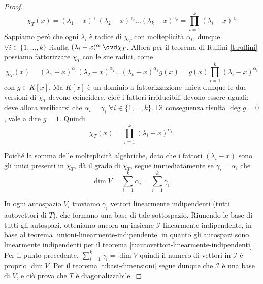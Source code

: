\begin{proof}
\begin{equation}
		\chi_T(x)=(\lambda_1-x)^{\gamma_1}(\lambda_2-x)^{\gamma_2}\dots(\lambda_k-x)^{\gamma_k}=\prod_{i=1}^k(\lambda_i-x)^{\gamma_i}
	\end{equation}
	Sappiamo però che ogni $\lambda_i$ è radice di $\chi_T$ con molteplicità $\alpha_i$, dunque $\forall i\in\{1,\dots,k\}$ risulta $(\lambda_i-x)^{\alpha_i}\dvd\chi_T$.
	Allora per il teorema di Ruffini \ref{t:ruffini} possiamo fattorizzare $\chi_T$ con le sue radici, come
	\begin{equation*}
		\chi_T(x)=(\lambda_1-x)^{\alpha_1}(\lambda_2-x)^{\alpha_2}\dots(\lambda_k-x)^{\alpha_k}g(x)=g(x)\prod_{i=1}^k(\lambda_i-x)^{\alpha_i}
	\end{equation*}
	con $g\in K[x]$.
	Ma $K[x]$ è un dominio a fattorizzazione unica %
	dunque le due versioni di $\chi_T$ devono coincidere, cioè i fattori irriducibili devono essere uguali: deve allora verificarsi che $\alpha_i=\gamma_i$ $\forall i\in\{1,\dots,k\}$.
	Di conseguenza risulta $\deg g=0$, vale a dire $g=1$.
	Quindi
	\begin{equation*}
		\chi_T(x)=\prod_{i=1}^k(\lambda_i-x)^{\alpha_i}.
	\end{equation*}

	Poich\'e la somma delle molteplicità algebriche, dato che i fattori $(\lambda_i-x)$ sono gli unici presenti in $\chi_T$, dà il grado di $\chi_T$, segue immediatamente se $\gamma_i=\alpha_i$ che
	\begin{equation}
		\dim V=\sum_{i=1}^k\alpha_i=\sum_{i=1}^k\gamma_i.
	\end{equation}

	In ogni autospazio $V_i$ troviamo $\gamma_i$ vettori linearmente indipendenti (tutti autovettori di $T$), che formano una base di tale sottospazio.
	Riunendo le base di tutti gli autospazi, otteniamo ancora un insieme $\mathcal I$ linearmente indipendente, in base al teorema \ref{unioni-linearmente-indipendente} %
	in quanto gli autospazi sono linearmente indipendenti per il teorema \ref{t:autovettori-linearmente-indipendenti}.
	Per il punto precedente, $\sum_{i=1}^k\gamma_i=\dim V$ quindi il numero di vettori in $\mathcal I$ è proprio $\dim V$.
	Per il teorema \ref{t:basi-dimensioni} segue dunque che $\mathcal I$ è una base di $V$, e ciò prova che $T$ è diagonalizzabile.
\end{proof}
